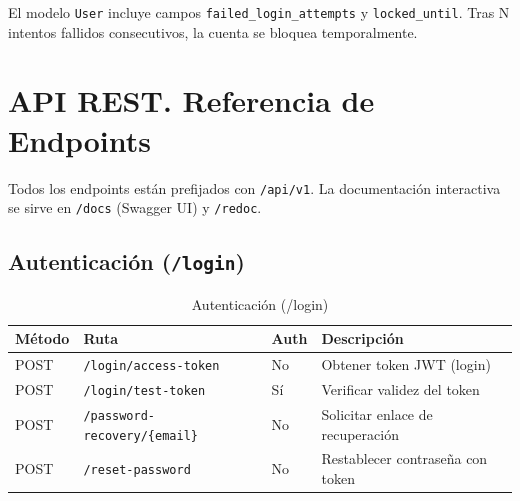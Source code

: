 El modelo \texttt{User} incluye campos \texttt{failed\_login\_attempts} y \texttt{locked\_until}. Tras N intentos fallidos consecutivos, la cuenta se bloquea temporalmente.

\section{API REST. Referencia de Endpoints}\label{api-rest.-referencia-de-endpoints}

Todos los endpoints están prefijados con \texttt{/api/v1}. La documentación interactiva se sirve en \texttt{/docs} (Swagger UI) y \texttt{/redoc}.

\subsection{\texorpdfstring{Autenticación (\texttt{/login})}{Autenticación (/login)}}\label{autenticaciuxf3n-login}

\begin{longtable}[]{@{}
  >{\raggedright\arraybackslash}p{}
  >{\raggedright\arraybackslash}p{}
  >{\raggedright\arraybackslash}p{}
  >{\raggedright\arraybackslash}p{}@{}}
\caption[Autenticación (/login)]{Autenticación (/login)}\tabularnewline
\toprule\noalign{}
\begin{minipage}[b]{\linewidth}\raggedright
Método
\end{minipage} & \begin{minipage}[b]{\linewidth}\raggedright
Ruta
\end{minipage} & \begin{minipage}[b]{\linewidth}\raggedright
Auth
\end{minipage} & \begin{minipage}[b]{\linewidth}\raggedright
Descripción
\end{minipage} \\
\midrule\noalign{}
\endhead
\bottomrule\noalign{}
\endlastfoot
POST & \texttt{/login/access-token} & No & Obtener token JWT (login) \\
POST & \texttt{/login/test-token} & Sí & Verificar validez del token \\
POST & \texttt{/password-recovery/\{email\}} & No & Solicitar enlace de recuperación \\
POST & \texttt{/reset-password} & No & Restablecer contraseña con token \\
\end{longtable}

